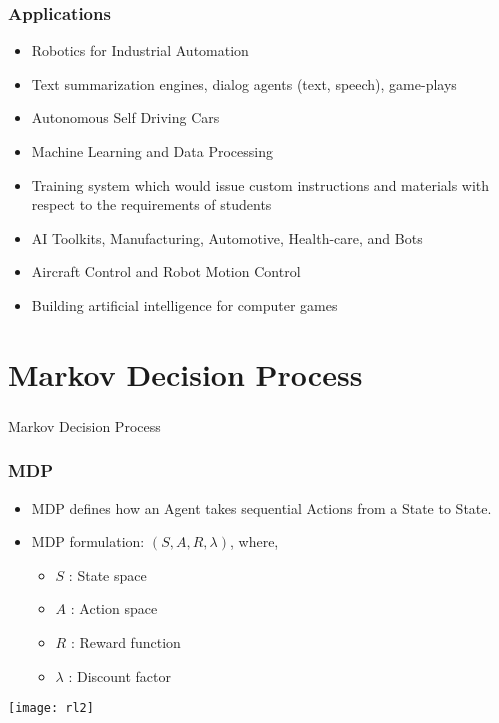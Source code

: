 \begin{frame}[fragile]\frametitle{Applications}

\begin{itemize}
\item Robotics for Industrial Automation
\item Text summarization engines, dialog agents (text, speech), game-plays
\item Autonomous Self Driving Cars
\item Machine Learning and Data Processing
\item Training system which would issue custom instructions and materials with respect to the requirements of students
\item AI Toolkits, Manufacturing, Automotive, Health-care, and Bots
\item Aircraft Control and Robot Motion Control
\item Building artificial intelligence for computer games
\end{itemize}

\end{frame}

\section[MDP]{Markov Decision Process}

\begin{frame}[fragile]\frametitle{}
\begin{center}
{\Large Markov Decision Process}
\end{center}
\end{frame}

\begin{frame}[fragile]\frametitle{MDP}

\begin{itemize}
\item MDP defines how an Agent takes sequential Actions from a State to State.
\item MDP formulation: $(S,A,R,\lambda)$, where,
	\begin{itemize}
	\item $S$ : State space
	\item $A$ : Action space
	\item $R$ : Reward function
	\item $\lambda$ : Discount factor
	\end{itemize}
\end{itemize}

\begin{center}
\texttt{[image: rl2]}
\end{center}

\end{frame}

